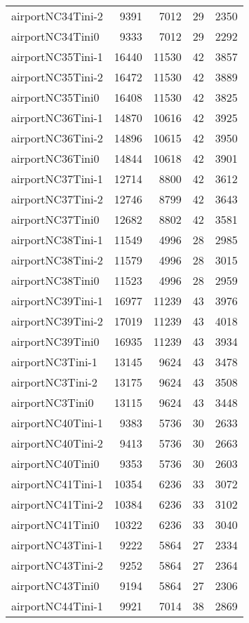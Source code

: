 \begin{longtable}{lrrrr}
airportNC34Tini-2 & 9391 & 7012 & 29 & 2350 \\
airportNC34Tini0 & 9333 & 7012 & 29 & 2292 \\
airportNC35Tini-1 & 16440 & 11530 & 42 & 3857 \\
airportNC35Tini-2 & 16472 & 11530 & 42 & 3889 \\
airportNC35Tini0 & 16408 & 11530 & 42 & 3825 \\
airportNC36Tini-1 & 14870 & 10616 & 42 & 3925 \\
airportNC36Tini-2 & 14896 & 10615 & 42 & 3950 \\
airportNC36Tini0 & 14844 & 10618 & 42 & 3901 \\
airportNC37Tini-1 & 12714 & 8800 & 42 & 3612 \\
airportNC37Tini-2 & 12746 & 8799 & 42 & 3643 \\
airportNC37Tini0 & 12682 & 8802 & 42 & 3581 \\
airportNC38Tini-1 & 11549 & 4996 & 28 & 2985 \\
airportNC38Tini-2 & 11579 & 4996 & 28 & 3015 \\
airportNC38Tini0 & 11523 & 4996 & 28 & 2959 \\
airportNC39Tini-1 & 16977 & 11239 & 43 & 3976 \\
airportNC39Tini-2 & 17019 & 11239 & 43 & 4018 \\
airportNC39Tini0 & 16935 & 11239 & 43 & 3934 \\
airportNC3Tini-1 & 13145 & 9624 & 43 & 3478 \\
airportNC3Tini-2 & 13175 & 9624 & 43 & 3508 \\
airportNC3Tini0 & 13115 & 9624 & 43 & 3448 \\
airportNC40Tini-1 & 9383 & 5736 & 30 & 2633 \\
airportNC40Tini-2 & 9413 & 5736 & 30 & 2663 \\
airportNC40Tini0 & 9353 & 5736 & 30 & 2603 \\
airportNC41Tini-1 & 10354 & 6236 & 33 & 3072 \\
airportNC41Tini-2 & 10384 & 6236 & 33 & 3102 \\
airportNC41Tini0 & 10322 & 6236 & 33 & 3040 \\
airportNC43Tini-1 & 9222 & 5864 & 27 & 2334 \\
airportNC43Tini-2 & 9252 & 5864 & 27 & 2364 \\
airportNC43Tini0 & 9194 & 5864 & 27 & 2306 \\
airportNC44Tini-1 & 9921 & 7014 & 38 & 2869 \\

\end{longtable}
